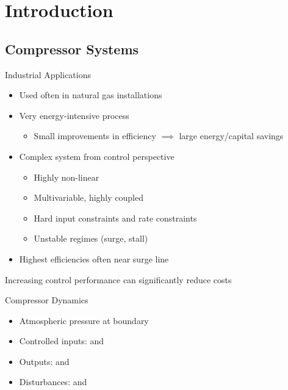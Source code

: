 \section{Introduction}

\subsection{Compressor Systems}

\begin{frame}{Industrial Applications}
  \begin{itemize}
    \item Used often in natural gas installations
    \item Very energy-intensive process
      \begin{itemize}
        \item Small improvements in efficiency $\implies$ large energy/capital savings
      \end{itemize}
    \item Complex system from control perspective
      \begin{itemize}
        \item Highly non-linear
        \item Multivariable, highly coupled
        \item Hard input constraints and rate constraints
        \item Unstable regimes (surge, stall)
      \end{itemize}
    \item Highest efficiencies often near surge line
  \end{itemize}

  \vfill
  \pause
  \alert{\centering Increasing control performance can significantly reduce costs\\}
\end{frame}

\begin{frame}{Compressor Dynamics}
  \begin{minipage}{0.6\linewidth}
    \resizebox{\linewidth}{!}{
      \begin{tikzpicture}
        \drawcomp
      \end{tikzpicture}
    }
  \end{minipage}
  \begin{minipage}{0.38\linewidth}
  \begin{itemize}
    \item Atmospheric pressure at boundary
    \item Controlled inputs:  and 
    \item Outputs:  and 
    \item Disturbances:  and 
  \end{itemize}
\end{minipage}
\end{frame}

